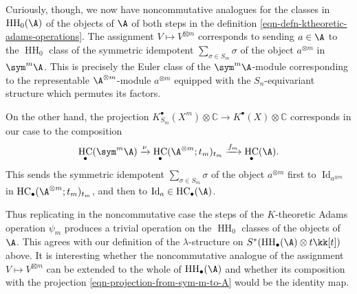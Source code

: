 \documentclass[12pt,a4paper,reqno]{amsart}
\DeclareMathOperator{\id}{Id}
\DeclareMathOperator{\hochhom}{{HH}}
\DeclareMathOperator{\hochcx}{{HC}}
\begin{document}
Curiously, though, we now have noncommutative analogues
for the classes in $\hochhom_0(\A)$ of the objects of $\A$
of both steps in the definition \eqref{eqn-defn-ktheoretic-adams-operations}.
The assignment $V \mapsto V^{\boxtimes m}$ 
corresponds to sending $a \in \A$ to the
$\hochhom_0$ class of the symmetric idempotent $\sum_{\sigma \in S_m}
\sigma$ of the object $a^{\otimes m}$ in $\sym^m \A$. 
This is precisely the Euler class of the $\sym^m \A$-module 
corresponding to the representable $\A^{\otimes m}$-module $a^{\otimes m}$
equipped with the $S_n$-equivariant structure which permutes its factors. 

On the other hand, the projection $K^\bullet_{S_m}(X^m) \otimes \mathbb{C}
\rightarrow K^\bullet(X) \otimes \mathbb{C}$ corresponds in our case to the composition 
\begin{align}
\label{eqn-projection-from-sym-m-to-A} 
\hochcx_\bullet(\sym^m \A) \xrightarrow{\nu}
\hochcx_\bullet(\A^{\otimes m};t_m)_{t_m} \xrightarrow{f_m}
\hochcx_\bullet(\A). 
\end{align}
This sends the symmetric idempotent 
$\sum_{\sigma \in S_m} \sigma$ of the object $a^{\otimes m}$ 
first to $\id_{a^{\otimes m}}$ in 
$\hochcx_\bullet(\A^{\otimes m};t_m)_{t_m}$, and then to 
$\id_a \in \hochcx_\bullet(\A)$. 

Thus replicating in the noncommutative case the steps
of the $K$-theoretic Adams operation $\psi_m$ produces
a trivial operation on the $\hochhom_0$ classes of the objects of $\A$. 
This agrees with our definition of the $\lambda$-structure on 
$S^*(\hochhom_\bullet(\A) \otimes t \kk[t])$ above. 
It is interesting whether the noncommutative analogue of 
the assignment $V \mapsto V^{\boxtimes m}$ can be extended to 
the whole of $\hochhom_\bullet(\A)$ and whether its composition 
with the projection \eqref{eqn-projection-from-sym-m-to-A} 
would be the identity map. 
\end{document}
